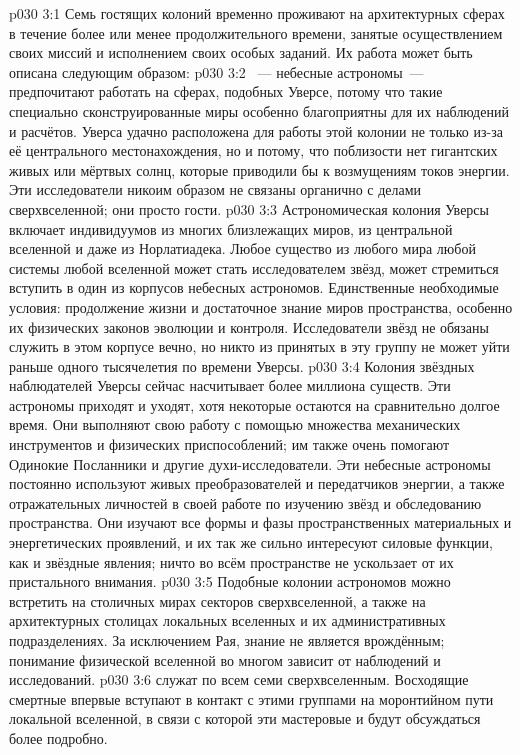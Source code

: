 \vs p030 3:1 Семь гостящих колоний временно проживают на архитектурных сферах в течение более или менее продолжительного времени, занятые осуществлением своих миссий и исполнением своих особых заданий. Их работа может быть описана следующим образом:
\vs p030 3:2 ~--- небесные астрономы~--- предпочитают работать на сферах, подобных Уверсе, потому что такие специально сконструированные миры особенно благоприятны для их наблюдений и расчётов. Уверса удачно расположена для работы этой колонии не только из-за её центрального местонахождения, но и потому, что поблизости нет гигантских живых или мёртвых солнц, которые приводили бы к возмущениям токов энергии. Эти исследователи никоим образом не связаны органично с делами сверхвселенной; они просто гости.
\vs p030 3:3 Астрономическая колония Уверсы включает индивидуумов из многих близлежащих миров, из центральной вселенной и даже из Норлатиадека. Любое существо из любого мира любой системы любой вселенной может стать исследователем звёзд, может стремиться вступить в один из корпусов небесных астрономов. Единственные необходимые условия: продолжение жизни и достаточное знание миров пространства, особенно их физических законов эволюции и контроля. Исследователи звёзд не обязаны служить в этом корпусе вечно, но никто из принятых в эту группу не может уйти раньше одного тысячелетия по времени  Уверсы.
\vs p030 3:4 Колония звёздных наблюдателей Уверсы сейчас насчитывает более миллиона существ. Эти астрономы приходят и уходят, хотя некоторые остаются на сравнительно долгое время. Они выполняют свою работу с помощью множества механических инструментов и физических приспособлений; им также очень помогают Одинокие Посланники и другие духи\hyp{}исследователи. Эти небесные астрономы постоянно используют живых преобразователей и передатчиков энергии, а также отражательных личностей в своей работе по изучению звёзд и обследованию пространства. Они изучают все формы и фазы пространственных материальных и энергетических проявлений, и их так же сильно интересуют силовые функции, как и звёздные явления; ничто во всём пространстве не ускользает от их пристального внимания.
\vs p030 3:5 Подобные колонии астрономов можно встретить на столичных мирах секторов сверхвселенной, а также на архитектурных столицах локальных вселенных и их административных подразделениях. За исключением Рая, знание не является врождённым; понимание физической вселенной во многом зависит от наблюдений и исследований.
\vs p030 3:6  служат по всем семи сверхвселенным. Восходящие смертные впервые вступают в контакт с этими группами на моронтийном пути локальной вселенной, в связи с которой эти мастеровые и будут обсуждаться более подробно.
